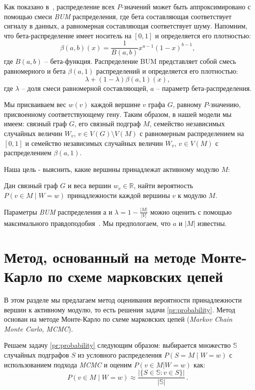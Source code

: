 Как показано в~\cite{Pounds2003,Dittrich2008a}, распределение всех $P$-значений
может быть аппроксимировано с помощью смеси \emph{BUM} распределения, где бета
составляющая соответствует сигналу в данных, а равномерная составляющая
соответствует шуму.  Напомним, что бета-распределение имеет носитель на $[0,
1]$ и определяется его плотностью:
\[\beta(a,b)(x) = \frac{1}{B(a,b)} x^{a-1}(1-x)^{b-1},\]
где $B(a, b)$ -- бета-функция. Распределение BUM представляет собой смесь
равномерного и бета $\beta(a, 1)$ распределений и определяется его плотностью:
\[\lambda +(1-\lambda)\beta(a,1)(x),\]
где $\lambda$ -- доля смеси равномерной составляющей, $a$ -- параметр
бета-распределения.

Мы присваиваем вес $w(v)$ каждой вершине $v$ графа $G$, равному $P$-значению,
присвоенному соответствующему гену.  Таким образом, в нашей модели мы имеем:
связный граф $G$, его связный подграф $M$, семейство независимых случайных
величин $W_v$, $v \in V (G) \setminus V(M)$ с равномерным распределением на
$[0, 1]$ и семейство независимых случайных величин $W_v$, $v \in V (M)$
с распределением $\beta(a, 1)$.

Наша цель - выяснить, какие вершины принадлежат активному модулю $M$:
\begin{problem}
    Дан связный граф $G$ и веса вершин $w_v \in \mathbb{R}$, найти вероятность
    $P(v \in M \mid W = w)$ принадлежности каждой вершины $v$ к модулю $M$.
    \label{pr:probability}
\end{problem}

Параметры \emph{BUM} распределения $а$ и $\lambda = 1 - \frac{|M|}{|V|}$
можно оценить с помощью максимального правдоподобия~\cite{Beisser2010}.
Мы предпологаем, что $a$ и $|M|$ известны.





\section{Метод, основанный на методе Монте-Карло по схеме марковских цепей}

В этом разделе мы предлагаем метод оценивания вероятности принадлежности вершин
к активному модулю, то есть решения задачи \ref{pr:probability}.  Метод основан
на методе Монте-Карло по схеме марковских цепей (\emph{Markov Chain Monte
Carlo}, \emph{MCMC}).

Решаем задачу \ref{pr:probability} следующим образом: выбирается множество
$\mathbb{S}$ случайных подграфов $S$ из условного распределения $P(S = M \mid
W = w)$ с использованием подхода \emph{MCMC} и оценим $P(v \in M|W = w)$ как:
\[P(v \in M \mid W = w) \approx \frac{|\{S \in \mathbb{S} : v \in
S\}|}{|\mathbb{S}|} \, .\]

